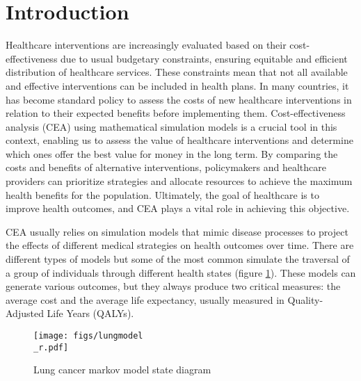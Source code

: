 \documentclass{IOS-Book-Article}
\def\hb{\hbox to 11.5 cm{}}
\begin{document}
	
	\section{Introduction}
	Healthcare interventions are increasingly evaluated based on their cost-effectiveness due to usual budgetary constraints, ensuring equitable and efficient distribution of healthcare services. These constraints mean that not all available and effective interventions can be included in health plans. In many countries, it has become standard policy to assess the costs of new healthcare interventions in relation to their expected benefits before implementing them. Cost-effectiveness analysis (CEA) using mathematical simulation models is a crucial tool in this context, enabling us to assess the value of healthcare interventions and determine which ones offer the best value for money in the long term\cite{drummond}. By comparing the costs and benefits of alternative interventions, policymakers and healthcare providers can prioritize strategies and allocate resources to achieve the maximum health benefits for the population. Ultimately, the goal of healthcare is to improve health outcomes, and CEA plays a vital role in achieving this objective\cite{levin}.
	
	CEA usually relies on simulation models that mimic disease processes to project the effects of different medical strategies on health outcomes over time\cite{applied_he}. There are different types of models but some of the most common simulate the traversal of a group of individuals through different health states (figure \ref{fig:lung_model}). These models can generate various outcomes, but they always produce two critical measures: the average cost and the average life expectancy, usually measured in Quality-Adjusted Life Years (QALYs)\cite{qalys}.
	
	\begin{figure}[h!]
		\centering	
		\texttt{[image: figs/lungmodel\\\_r.pdf]}		
		\caption{Lung cancer markov model state diagram}	
		\label{fig:lung_model}	
	\end{figure}
	
	
\end{document}
